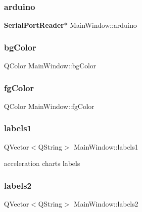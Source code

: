 \subsubsection{arduino}
{\footnotesize\ttfamily \textbf{ Serial\+Port\+Reader}$\ast$ Main\+Window\+::arduino\hspace{0.3cm}{\ttfamily [private]}}

\mbox{\label{class_main_window_a4a1005daadc7447af6907c57b54e41ab}} 
\subsubsection{bg\+Color}
{\footnotesize\ttfamily Q\+Color Main\+Window\+::bg\+Color\hspace{0.3cm}{\ttfamily [private]}}

\mbox{\label{class_main_window_a1f5455abfb51d7c4733bfad76ac60606}} 
\subsubsection{fg\+Color}
{\footnotesize\ttfamily Q\+Color Main\+Window\+::fg\+Color\hspace{0.3cm}{\ttfamily [private]}}

\mbox{\label{class_main_window_a9243762b319de95b998df3e36934d6ef}} 
\subsubsection{labels1}
{\footnotesize\ttfamily Q\+Vector$<$Q\+String$>$ Main\+Window\+::labels1\hspace{0.3cm}{\ttfamily [private]}}

acceleration chart\textquotesingle{}s labels \mbox{\label{class_main_window_a81d3e91905b239abfc54858b2954b7f7}} 
\subsubsection{labels2}
{\footnotesize\ttfamily Q\+Vector$<$Q\+String$>$ Main\+Window\+::labels2\hspace{0.3cm}{\ttfamily [private]}}

